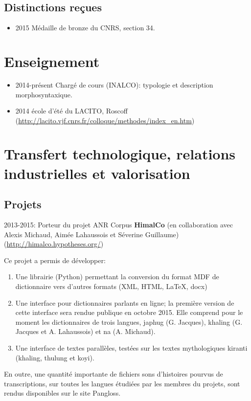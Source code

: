 \documentclass[oldfontcommands,oneside,a4paper,11pt]{article}
\begin{document}
\subsection{Distinctions reçues}  
\begin{itemize}
\item 2015 Médaille de bronze du CNRS, section 34.
\end{itemize}
  
\section{Enseignement}
\begin{itemize}
\item 2014-présent Chargé de cours (INALCO): typologie et description morphosyntaxique.
\item 2014 école d'été du LACITO, Roscoff (\url{http://lacito.vjf.cnrs.fr/colloque/methodes/index\_en.htm})
\end{itemize}

\section{Transfert technologique, relations industrielles et valorisation}

\subsection{Projets}
2013-2015: Porteur du projet ANR Corpus \textbf{HimalCo} (en collaboration avec Alexis Michaud, Aimée Lahaussois et Séverine Guillaume) (\url{http://himalco.hypotheses.org/})

Ce projet a permis de développer:

\begin{enumerate}
\item Une librairie (Python) permettant la conversion du format MDF de dictionnaire vers d'autres formats (XML, HTML, \LaTeX, docx)
\item Une interface pour dictionnaires parlants en ligne; la première version de cette interface sera rendue publique en octobre 2015. Elle comprend pour le moment les dictionnaires de trois langues, japhug (G. Jacques), khaling (G. Jacques et A. Lahaussois) et na (A. Michaud).
\item Une interface de textes parallèles, testées sur les textes mythologiques kiranti (khaling, thulung et koyi).
\end{enumerate}

En outre, une quantité importante de fichiers sons d'histoires pourvus de transcriptions, sur toutes les langues étudiées par les membres du projets, sont rendus disponibles sur le site Pangloss.
\end{document}
